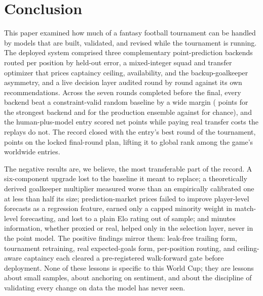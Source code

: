 \section{Conclusion}
\label{sec:conclusion}


This paper examined how much of a fantasy football tournament can be
handled by models that are built, validated, and revised while the
tournament is running. The deployed system comprised three
complementary point-prediction backends routed per position by
held-out error, a mixed-integer squad and transfer optimizer that
prices captaincy ceiling, availability, and the backup-goalkeeper
asymmetry, and a live decision layer audited round by round against
its own recommendations. Across the seven rounds
completed before the final, every backend beat a constraint-valid
random baseline by a wide margin (\TotalGbm{} points for the strongest
backend and \TotalEnsemble{} for the production ensemble against
\TotalRandomBaselineMean{} for chance), and the human-plus-model entry
scored \TotalUserActualNet{} net points while paying real transfer
costs the replays do not. The record closed with the entry's best
round of the tournament, \FinalRoundNet{} points on the locked
final-round plan, lifting it to global rank \GlobalRankFinal{}
among the game's worldwide entries.

The negative results are, we believe, the most transferable part of
the record. A six-component upgrade lost to the baseline it meant to
replace; a theoretically derived goalkeeper multiplier measured worse
than an empirically calibrated one at less than half its size;
prediction-market prices failed to improve player-level forecasts as a
regression feature, earned only a capped minority weight in match-level
forecasting, and lost to a plain Elo rating out of sample; and minutes
information, whether proxied or real, helped only in the selection
layer, never in the point model. The positive findings mirror them:
leak-free trailing form, tournament retraining, real expected-goals
form, per-position routing, and ceiling-aware captaincy each cleared a
pre-registered walk-forward gate before deployment. None of these
lessons is specific to this World Cup; they are lessons about small
samples, about anchoring on sentiment, and about the discipline of
validating every change on data the model has never seen.

